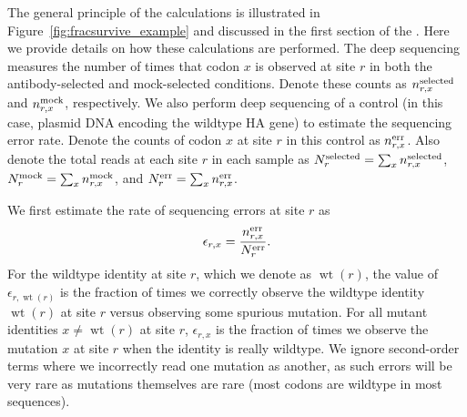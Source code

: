 \documentclass[11pt]{article}
\begin{document}
The general principle of the calculations is illustrated in Figure~\ref{fig:fracsurvive_example} and discussed in the first section of the .
Here we provide details on how these calculations are performed.
The deep sequencing measures the number of times that codon $x$ is observed at site $r$ in both the antibody-selected and mock-selected conditions. 
Denote these counts as $n_{r,x}^{\rm{selected}}$ and $n_{r,x}^{\rm{mock}}$, respectively.
We also perform deep sequencing of a control (in this case, plasmid DNA encoding the wildtype HA gene) to estimate the sequencing error rate.
Denote the counts of codon $x$ at site $r$ in this control as $n_{r,x}^{\rm{err}}$.
Also denote the total reads at each site $r$ in each sample as
$N_{r}^{\rm{selected}} = \sum_x n_{r,x}^{\rm{selected}}$,
$N_{r}^{\rm{mock}} = \sum_x n_{r,x}^{\rm{mock}}$, and
$N_{r}^{\rm{err}} = \sum_x n_{r,x}^{\rm{err}}$.

We first estimate the rate of sequencing errors at site $r$ as
\begin{equation}
\label{eq:epsilonrx}
\epsilon_{r,x} = \frac{n_{r,x}^{\rm{err}}}{N_{r}^{\rm{err}}}.
\end{equation}
For the wildtype identity at site $r$, which we denote as $\operatorname{wt}\left(r\right)$, the value of $\epsilon_{r,\operatorname{wt}\left(r\right)}$ is the fraction of times we correctly observe the wildtype identity $\operatorname{wt}\left(r\right)$ at site $r$ versus observing some spurious mutation. 
For all mutant identities $x \ne \operatorname{wt}\left(r\right)$ at site $r$, $\epsilon_{r,x}$ is the fraction of times we observe the mutation $x$ at site $r$ when the identity is really wildtype.
We ignore second-order terms where we incorrectly read one mutation as another, as such errors will be very rare as mutations themselves are rare (most codons are wildtype in most sequences). 
\end{document}
